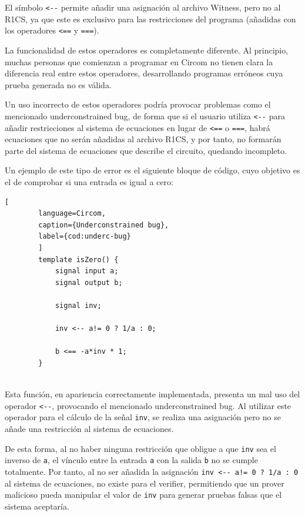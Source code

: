 \documentclass[a4paper,12pt]{report}
\begin{document}
	\vspace{0.2cm}
	\noindent El símbolo \texttt{<-}\texttt{-} permite añadir una asignación al archivo Witness, pero no al R1CS, ya que este es exclusivo para las restricciones del programa (añadidas con los operadores  \texttt{<==} y \texttt{===}). 
	
	\vspace{0.2cm}
	\noindent La funcionalidad de estos operadores es completamente diferente. Al principio, muchas personas que comienzan a programar en Circom no tienen clara la diferencia real entre estos operadores, desarrollando programas erróneos cuya prueba generada no es válida.
	
	\vspace{0.2cm}
	\noindent Un uso incorrecto de estos operadores podría provocar problemas como el mencionado underconstrained bug, de forma que si el usuario utiliza  \texttt{<-}\texttt{-} para añadir restricciones al sistema de ecuaciones en lugar de \texttt{<==} o \texttt{===}, habrá ecuaciones que no serán añadidas al archivo R1CS, y por tanto, no formarán parte del sistema de ecuaciones que describe el circuito, quedando incompleto.
	
	\vspace{0.2cm}
	\noindent Un ejemplo de este tipo de error es el siguiente bloque de código, cuyo objetivo es el de comprobar si una entrada es igual a cero:
	
	\vspace{0.2cm}
	\begin{lstlisting}[
		language=Circom, 
		caption={Underconstrained bug}, 
		label={cod:underc-bug}
		]
		template isZero() {
			signal input a;
			signal output b;
			
			signal inv;
			
			inv <-- a!= 0 ? 1/a : 0;
			
			b <== -a*inv * 1;
		}
		
	\end{lstlisting}
	
	
	\vspace{0.2cm}
	\noindent Esta función, en apariencia correctamente implementada, presenta un mal uso del operador \texttt{<-}\texttt{-}, provocando el mencionado underconstrained bug. Al utilizar este operador para el cálculo de la señal \texttt{inv}, se realiza una asignación pero no se añade una restricción al sistema de ecuaciones. 
	
	\vspace{0.2cm}
	\noindent De esta forma, al no haber ninguna restricción que obligue a que \texttt{inv} sea el inverso de \texttt{a}, el vínculo entre la entrada \texttt{a} con la salida \texttt{b} no se cumple totalmente. Por tanto, al no ser añadida la asignación \texttt{inv <-}\texttt{- a!= 0 ? 1/a : 0} al sistema de ecuaciones, no existe para el verifier, permitiendo que un prover malicioso  pueda manipular el valor de \texttt{inv} para generar pruebas falsas que el sistema aceptaría.
	
\end{document}
